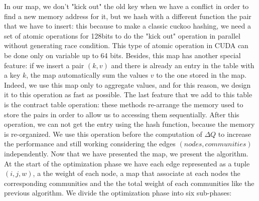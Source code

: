 In our map, we don't "kick out" the old key when we have a conflict in order to find a new memory address for it, but we hash with a different function the pair that we have to insert: this because to make a classic cuckoo hashing, we need a set of atomic operations for 128bits to do the "kick out" operation in parallel without generating race condition. This type of atomic operation in CUDA can be done only on variable up to 64 bits. Besides, this map has another special feature: if we insert a pair $(k,v)$ and there is already an entry in the table with a key $k$, the map automatically sum the values $v$ to the one stored in the map. Indeed, we use this map only to aggregate values, and for this reason, we design it to this operation as fast as possible. The last feature that we add to this table is the contract table operation: these methods re-arrange the memory used to store the pairs in order to allow us to accessing them sequentially. After this operation, we can not get the entry using the hash function, because the memory is re-organized. We use this operation before the computation of $\Delta Q$ to increase the performance and still working considering the edges $(nodes, communities)$ independently. 
Now that we have presented the map, we present the algorithm. At the start of the optimization phase we have each edge represented as a tuple $(i,j,w)$,  a the weight of each node,  a map that associate at each nodes the corresponding communities  and the the total weight of each communities like the previous algorithm. 
We divide the optimization phase into six sub-phases:
